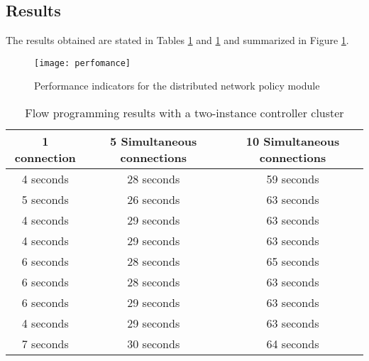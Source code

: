 \subsection{Results}
\label{subsection:performance-tests-results}
%
The results obtained are stated in Tables \ref{table:perfomance-tests-2controllers} and \ref{table:perfomance-tests-2controllers} and summarized in Figure \ref{fig:perfomance}.
%
\begin{figure}
	\centering
	\texttt{[image: perfomance]}
	\caption{Performance indicators for the distributed network policy module}
	\label{fig:perfomance}
\end{figure}
%
\begin{table}[h!]
	\begin{center}
		\begin{tabular}{ | c | c | c | }
			\rowcolor{HeaderRowColor}
			\hline
			\textbf{1 connection} & \textbf{5 Simultaneous connections} & \textbf{10 Simultaneous connections}\\
			\hline
			4 seconds & 28 seconds & 59 seconds\\
			\hline
			5 seconds & 26 seconds & 63 seconds\\
			\hline
			4 seconds & 29 seconds & 63 seconds\\
			\hline
			4 seconds & 29 seconds & 63 seconds\\
			\hline
			6 seconds & 28 seconds & 65 seconds\\
			\hline
			6 seconds & 28 seconds & 63 seconds\\
			\hline
			6 seconds & 29 seconds & 63 seconds\\
			\hline
			4 seconds & 29 seconds & 63 seconds\\
			\hline
			7 seconds & 30 seconds & 64 seconds\\
			\hline
		\end{tabular}
		\caption{Flow programming results with a two-instance controller cluster}
		\label{table:perfomance-tests-2controllers}
	\end{center}
\end{table}
%
